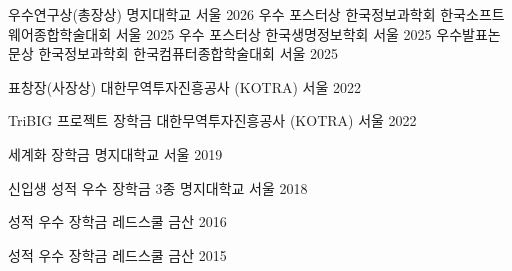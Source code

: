 \documentclass[11pt, a4paper]{awesome-cv}
\let\origcvsubsection\cvsubsection
\renewcommand{\cvsubsection}[1]{\needspace{5\baselineskip}\origcvsubsection{#1}}
\begin{document}
\begin{cvhonors}

  \cvhonor
    {우수연구상(총장상)}
    {명지대학교}
    {서울}
    {2026}
  \cvhonor
    {우수 포스터상}
    {한국정보과학회 한국소프트웨어종합학술대회}
    {서울}
    {2025}
  \cvhonor
    {우수 포스터상}
    {한국생명정보학회}
    {서울}
    {2025}
  \cvhonor
    {우수발표논문상}
    {한국정보과학회 한국컴퓨터종합학술대회}
    {서울}
    {2025}

  \cvhonor
    {표창장(사장상)}
    {대한무역투자진흥공사 (KOTRA)}
    {서울}
    {2022}

\end{cvhonors}





\begin{cvhonors}

\cvhonor
    {TriBIG 프로젝트 장학금}
    {대한무역투자진흥공사 (KOTRA)}
    {서울}
    {2022}

  \cvhonor
    {세계화 장학금}
    {명지대학교}
    {서울}
    {2019}

  \cvhonor
    {신입생 성적 우수 장학금 3종}
    {명지대학교}
    {서울}
    {2018}

\cvhonor
    {성적 우수 장학금}
    {레드스쿨}
    {금산}
    {2016}

\cvhonor
    {성적 우수 장학금}
    {레드스쿨}
    {금산}
    {2015}


\end{cvhonors}
\end{document}
